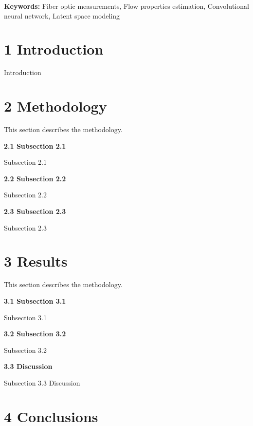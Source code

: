 \documentclass[10pt, twoside]{article}
\begin{document}
\textbf{Keywords:} Fiber optic measurements, Flow properties estimation, Convolutional neural network, Latent space modeling

\section*{\textbf{1 Introduction}}

Introduction

\section*{\textbf{2 Methodology}}

This section describes the methodology.

\textbf{2.1 Subsection 2.1} 

Subsection 2.1

\textbf{2.2 Subsection 2.2} 

Subsection 2.2


\textbf{2.3 Subsection 2.3} 

Subsection 2.3


\section*{\textbf{3 Results}}

This section describes the methodology.

\textbf{3.1 Subsection 3.1}

Subsection 3.1

\textbf{3.2 Subsection 3.2}

Subsection 3.2

\textbf{3.3 Discussion}

Subsection 3.3 Discussion

\section*{\textbf{4 Conclusions}}
\end{document}
